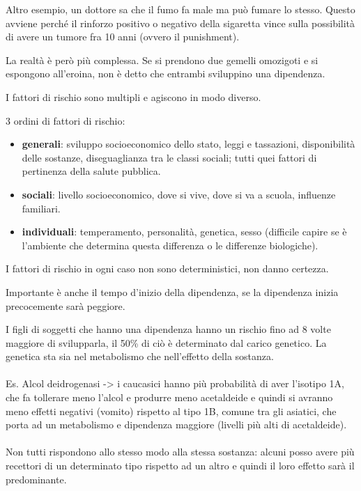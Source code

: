 Altro esempio, un dottore sa che il fumo fa male ma può fumare lo
stesso. Questo avviene perché il rinforzo positivo o negativo della
sigaretta vince sulla possibilità di avere un tumore fra 10 anni (ovvero
il punishment).

La realtà è però più complessa. Se si prendono due gemelli omozigoti e
si espongono all'eroina, non è detto che entrambi sviluppino una
dipendenza.

I fattori di rischio sono multipli e agiscono in modo diverso.

3 ordini di fattori di rischio:

\begin{itemize}
\item
  \textbf{generali}: sviluppo socioeconomico dello stato, leggi e
  tassazioni, disponibilità delle sostanze, diseguaglianza tra le classi
  sociali; tutti quei fattori di pertinenza della salute pubblica.
\item
  \textbf{sociali}: livello socioeconomico, dove si vive, dove si va a
  scuola, influenze familiari.
\item

  \textbf{individuali}: temperamento, personalità, genetica, sesso
  (difficile capire se è l'ambiente che determina questa differenza o le
  differenze biologiche).
\end{itemize}

I fattori di rischio in ogni caso non sono deterministici, non danno
certezza.

Importante è anche il tempo d'inizio della dipendenza, se la dipendenza
inizia precocemente sarà peggiore.

I figli di soggetti che hanno una dipendenza hanno un rischio fino ad 8
volte maggiore di svilupparla, il 50\% di ciò è determinato dal carico
genetico. La genetica sta sia nel metabolismo che nell'effetto della
sostanza.
\\\\
Es. Alcol deidrogenasi -> i caucasici hanno più probabilità di aver
l'isotipo 1A, che fa tollerare meno l'alcol e produrre meno acetaldeide
e quindi si avranno meno effetti negativi (vomito) rispetto al tipo 1B,
comune tra gli asiatici, che porta ad un metabolismo e dipendenza
maggiore (livelli più alti di acetaldeide).
\\\\
Non tutti rispondono allo stesso modo alla stessa sostanza: alcuni posso
avere più recettori di un determinato tipo rispetto ad un altro e quindi
il loro effetto sarà il predominante.

